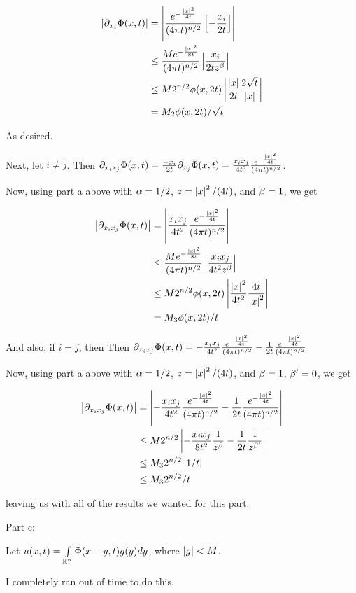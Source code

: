 \documentclass[a4paper,12pt]{article}
\begin{document}
\begin{align*}
\left\lvert \partial_{x_i} \Phi(x,t) \right\rvert &= \left\lvert \frac{e^{-\frac{\left\lvert x \right\rvert^2}{4t}}}{(4 \pi t)^{n/2}}\left[-\frac{x_i}{2t}\right] \right\rvert\\
&\leq \frac{Me^{-\frac{\left\lvert x \right\rvert^2}{8t}}}{(4 \pi t)^{n/2}}\left\lvert \frac{x_i}{2tz^\beta} \right\rvert\\
&\leq M 2^{n/2}\phi(x,2t)\left\lvert \frac{\left\lvert x \right\rvert}{2t} \frac{2\sqrt{t}}{\left\lvert x \right\rvert} \right\rvert\\
&= M_2\phi(x,2t)/\sqrt{t}\\
\end{align*}

As desired. 

Next, let $i \neq j$. Then $\partial_{x_ix_j} \Phi(x,t) = \frac{-x_i}{2t} \partial_{x_j} \Phi(x,t) = \frac{x_ix_j}{4t^2} \frac{e^{-\frac{\left\lvert x \right\rvert^2}{4t}}}{(4 \pi t)^{n/2}}$.

Now, using part a above with $\alpha = 1/2$, $z = \left\lvert x \right\rvert^2/(4t)$, and $\beta = 1$, we get

\begin{align*}
\left\lvert \partial_{x_ix_j} \Phi(x,t) \right\rvert &= \left\lvert \frac{x_ix_j}{4t^2} \frac{e^{-\frac{\left\lvert x \right\rvert^2}{4t}}}{(4 \pi t)^{n/2}} \right\rvert\\
&\leq \frac{Me^{-\frac{\left\lvert x \right\rvert^2}{8t}}}{(4 \pi t)^{n/2}}\left\lvert \frac{x_ix_j}{4t^2z^\beta} \right\rvert\\
&\leq M 2^{n/2}\phi(x,2t)\left\lvert \frac{\left\lvert x \right\rvert^2}{4t^2} \frac{4t}{\left\lvert x \right\rvert^2} \right\rvert\\
&= M_3\phi(x,2t)/t\\
\end{align*}

And also, if $i = j$, then Then $\partial_{x_ix_j} \Phi(x,t) =-\frac{x_ix_j}{4t^2} \frac{e^{-\frac{\left\lvert x \right\rvert^2}{4t}}}{(4 \pi t)^{n/2}} - \frac{1}{2t} \frac{e^{-\frac{\left\lvert x \right\rvert^2}{4t}}}{(4 \pi t)^{n/2}}$

Now, using part a above with $\alpha = 1/2$, $z = \left\lvert x \right\rvert^2/(4t)$, and $\beta = 1$, $\beta'=0$, we get

\begin{align*}
\left\lvert \partial_{x_ix_j} \Phi(x,t) \right\rvert &=\left\lvert -\frac{x_ix_j}{4t^2} \frac{e^{-\frac{\left\lvert x \right\rvert^2}{4t}}}{(4 \pi t)^{n/2}} - \frac{1}{2t} \frac{e^{-\frac{\left\lvert x \right\rvert^2}{4t}}}{(4 \pi t)^{n/2}} \right\rvert\\
&\leq M 2^{n/2}\left\lvert -\frac{x_ix_j}{8t^2} \frac{1}{z^\beta} - \frac{1}{2t} \frac{1}{z^{\beta'}} \right\rvert\\
&\leq M_3 2^{n/2}\left\lvert 1/t \right\rvert\\
&\leq M_3 2^{n/2}/t\\
\end{align*}

leaving us with all of the results we wanted for this part.

\shunt

Part c:

Let $u(x,t) = \int\limits_{\mathbb{R}^n} \Phi(x-y,t) g(y) dy$, where $\left\lvert g \right\rvert < M$.

I completely ran out of time to do this. 

\shunt
\end{document}
